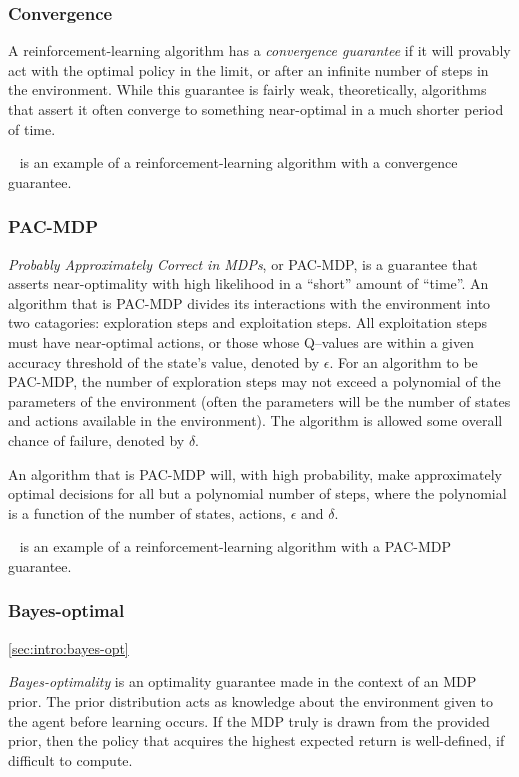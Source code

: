 \subsubsection{Convergence}

A reinforcement-learning algorithm has a \emph{convergence guarantee} if it will provably act with the optimal policy in the limit, or after an infinite number of steps in the environment. While this guarantee is fairly weak, theoretically, algorithms that assert it often converge to something near-optimal in a much shorter period of time.

~\cite{Watkins92} is an example of a reinforcement-learning algorithm with a convergence guarantee.

\subsubsection{PAC-MDP}

\emph{Probably Approximately Correct in MDPs}, or PAC-MDP, is a guarantee that asserts near-optimality with high likelihood in a ``short'' amount of ``time''. An algorithm that is PAC-MDP divides its interactions with the environment into two catagories: exploration steps and exploitation steps. All exploitation steps must have near-optimal actions, or those whose Q--values are within a given accuracy threshold of the state's value, denoted by $\epsilon$. For an algorithm to be PAC-MDP, the number of exploration steps may not exceed a polynomial of the parameters of the environment (often the parameters will be the number of states and actions available in the environment). The algorithm is allowed some overall chance of failure, denoted by $\delta$.

An algorithm that is PAC-MDP will, with high probability, make approximately optimal decisions for all but a polynomial number of steps, where the polynomial is a function of the number of states, actions, $\epsilon$ and $\delta$.

~\cite{brafman02} is an example of a reinforcement-learning algorithm with a PAC-MDP guarantee.

\subsubsection{Bayes-optimal}

\ref{sec:intro:bayes-opt}

\emph{Bayes-optimality} is an optimality guarantee made in the context of an MDP prior. The prior distribution acts as knowledge about the environment given to the agent before learning occurs. If the MDP truly is drawn from the provided prior, then the policy that acquires the highest expected return is well-defined, if difficult to compute.

